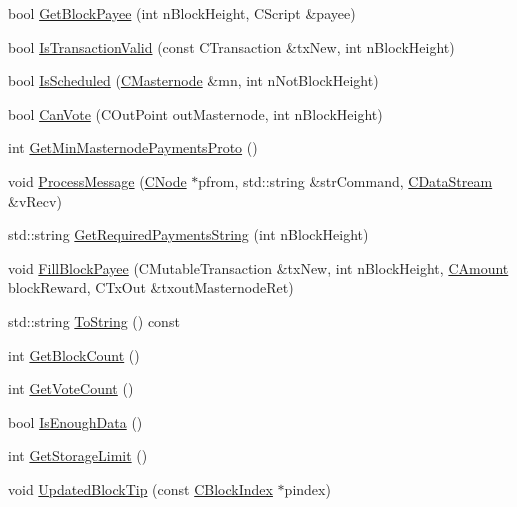 \begin{DoxyCompactItemize}
bool \mbox{\hyperlink{class_c_masternode_payments_a23ced53f72a503a71bbe6be8d472ecfd}{Get\+Block\+Payee}} (int n\+Block\+Height, C\+Script \&payee)
\item 
bool \mbox{\hyperlink{class_c_masternode_payments_aa1376c50210f892f65ad7ee6408c02f9}{Is\+Transaction\+Valid}} (const C\+Transaction \&tx\+New, int n\+Block\+Height)
\item 
bool \mbox{\hyperlink{class_c_masternode_payments_ae7b481b02b86b14946497bb21e375f1a}{Is\+Scheduled}} (\mbox{\hyperlink{class_c_masternode}{C\+Masternode}} \&mn, int n\+Not\+Block\+Height)
\item 
bool \mbox{\hyperlink{class_c_masternode_payments_ad0891106128d392e1cb4206061b4aec4}{Can\+Vote}} (C\+Out\+Point out\+Masternode, int n\+Block\+Height)
\item 
int \mbox{\hyperlink{class_c_masternode_payments_adb98cc9f21cf8746c0b6ac3131b85dfb}{Get\+Min\+Masternode\+Payments\+Proto}} ()
\item 
void \mbox{\hyperlink{class_c_masternode_payments_ab81d81b3bd4358f343f98d5b2ad4336a}{Process\+Message}} (\mbox{\hyperlink{class_c_node}{C\+Node}} $\ast$pfrom, std\+::string \&str\+Command, \mbox{\hyperlink{class_c_data_stream}{C\+Data\+Stream}} \&v\+Recv)
\item 
std\+::string \mbox{\hyperlink{class_c_masternode_payments_a5527c8d625c8e32ea27cf645453365cc}{Get\+Required\+Payments\+String}} (int n\+Block\+Height)
\item 
void \mbox{\hyperlink{class_c_masternode_payments_a6c323905008eeba029283b2467463b9e}{Fill\+Block\+Payee}} (C\+Mutable\+Transaction \&tx\+New, int n\+Block\+Height, \mbox{\hyperlink{amount_8h_a4eaf3a5239714d8c45b851527f7cb564}{C\+Amount}} block\+Reward, C\+Tx\+Out \&txout\+Masternode\+Ret)
\item 
std\+::string \mbox{\hyperlink{class_c_masternode_payments_ac020d2b42771a003a271d4ddb014272a}{To\+String}} () const
\item 
int \mbox{\hyperlink{class_c_masternode_payments_ab7679d3a59bcccefe00eeff3e18a8e77}{Get\+Block\+Count}} ()
\item 
int \mbox{\hyperlink{class_c_masternode_payments_a5bef017573f7ecee7e1a15a4b1c43017}{Get\+Vote\+Count}} ()
\item 
bool \mbox{\hyperlink{class_c_masternode_payments_a3136ca03b99f310b24416df6ed6daea7}{Is\+Enough\+Data}} ()
\item 
int \mbox{\hyperlink{class_c_masternode_payments_a7dc5c44ba12a6f3c7c502cd046ce3000}{Get\+Storage\+Limit}} ()
\item 
void \mbox{\hyperlink{class_c_masternode_payments_a553956af74bd1b03c7090b98841d61fb}{Updated\+Block\+Tip}} (const \mbox{\hyperlink{class_c_block_index}{C\+Block\+Index}} $\ast$pindex)
\end{DoxyCompactItemize}
